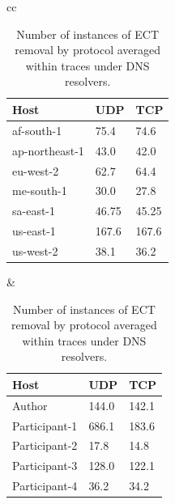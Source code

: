 \documentclass{l4proj}
\begin{document}
\begin{table}[H]
\begin{tabular}{cc}
\centering
    \begin{minipage}{.5\linewidth}
        \begin{tabular}{|l|l|l|}
            \hline
            Host           & UDP   & TCP   \\ \hline
            af-south-1     & 75.4  & 74.6  \\ \hline
            ap-northeast-1 & 43.0  & 42.0  \\ \hline
            eu-west-2      & 62.7  & 64.4  \\ \hline
            me-south-1     & 30.0  & 27.8  \\ \hline
            sa-east-1      & 46.75 & 45.25 \\ \hline
            us-east-1      & 167.6 & 167.6 \\ \hline
            us-west-2      & 38.1  & 36.2  \\ \hline
        \end{tabular}
    \end{minipage} &

    \begin{minipage}{.5\linewidth}
        \begin{tabular}{|l|l|l|}
            \hline
            Host          & UDP   & TCP   \\ \hline
            Author        & 144.0 & 142.1 \\ \hline
            Participant-1 & 686.1 & 183.6 \\ \hline
            Participant-2 & 17.8  & 14.8  \\ \hline
            Participant-3 & 128.0 & 122.1 \\ \hline
            Participant-4 & 36.2  & 34.2  \\ \hline
        \end{tabular}
    \end{minipage}
    
\end{tabular}
\caption{Number of instances of ECT removal by protocol averaged within traces under DNS resolvers.}
\label{table:protoect}
\end{table}
\end{document}
